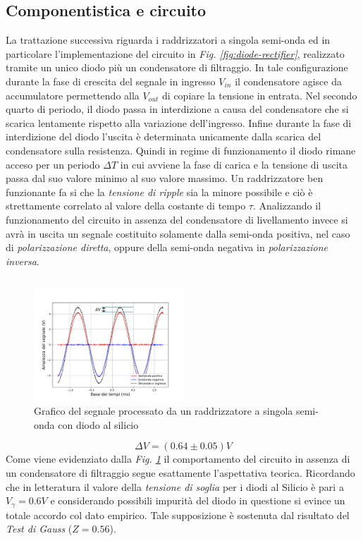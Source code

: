 \documentclass[journal]{IEEEtran}
\begin{document}
\subsection{\textbf{Componentistica e circuito}}
La trattazione successiva riguarda i raddrizzatori a singola semi-onda ed in particolare l'implementazione del circuito in \textit{Fig. \ref{fig:diode-rectifier}}, realizzato tramite un unico diodo più un condensatore di filtraggio. In tale configurazione durante la fase di crescita del segnale in ingresso $V_{in}$ il condensatore agisce da accumulatore permettendo alla $V_{out}$ di copiare la tensione in entrata. Nel secondo quarto di periodo, il diodo passa in interdizione a causa del condensatore che si scarica lentamente rispetto alla variazione dell'ingresso. Infine durante la fase di interdizione del diodo l'uscita è determinata unicamente dalla scarica del condensatore sulla resistenza.
Quindi in regime di funzionamento il diodo rimane acceso per un periodo $\Delta T$ in cui avviene la fase di carica e la tensione di uscita passa dal suo valore minimo al suo valore massimo. Un raddrizzatore ben funzionante fa si che la \textit{tensione di ripple} sia la minore possibile e ciò è strettamente correlato al valore della costante di tempo $\tau$.
Analizzando il funzionamento del circuito in assenza del condensatore di livellamento invece si avrà in uscita un segnale costituito solamente dalla semi-onda positiva, nel caso di \textit{polarizzazione diretta}, oppure della semi-onda negativa in \textit{polarizzazione inversa}.

\subsection{}
\begin{figure}[H]%
\begin {center}
\includegraphics[width=0.50\textwidth]{analysis/output/half-wave-rectifier.pdf}
\caption{Grafico del segnale processato da un raddrizzatore a singola semi-onda con diodo al silicio}
\label{fig:half-wave}
\end {center}
\end{figure}
\[\Delta V = (0.64 \pm 0.05) V\] 
Come viene evidenziato dalla \textit{Fig. \ref{fig:half-wave}} il comportamento del circuito in assenza di un condensatore di filtraggio segue esattamente l'aspettativa teorica. Ricordando che in letteratura il valore della \textit{tensione di soglia} per i diodi al Silicio è pari a $V_{\gamma}=0.6V$ e considerando possibili impurità del diodo in questione si evince un totale accordo col dato empirico. Tale supposizione è sostenuta dal risultato del \textit{Test di Gauss} ($Z = 0.56$).
\end{document}
